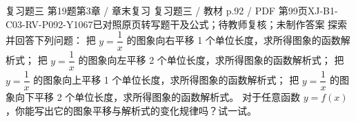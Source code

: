 \par\noindent\begin{minipage}{\linewidth}
\begin{bankitem}{复习题三 第19题}{第3章 / 章末复习 复习题三 / 教材 p.92 / PDF 第99页}{XJ-B1-C03-RV-P092-Y1067}{已对照原页转写题干及公式；待教师复核；未制作答案}
探索并回答下列问题：
把 $y=\dfrac1x$ 的图象向右平移 1 个单位长度，求所得图象的函数解析式；
把 $y=\dfrac1x$ 的图象向左平移 2 个单位长度，求所得图象的函数解析式；
把 $y=\dfrac1x$ 的图象向上平移 1 个单位长度，求所得图象的函数解析式；
把 $y=\dfrac1x$ 的图象向下平移 2 个单位长度，求所得图象的函数解析式。
对于任意函数 $y=f(x)$，你能写出它的图象平移与解析式的变化规律吗？试一试。
\end{bankitem}
\end{minipage}\par\medskip
